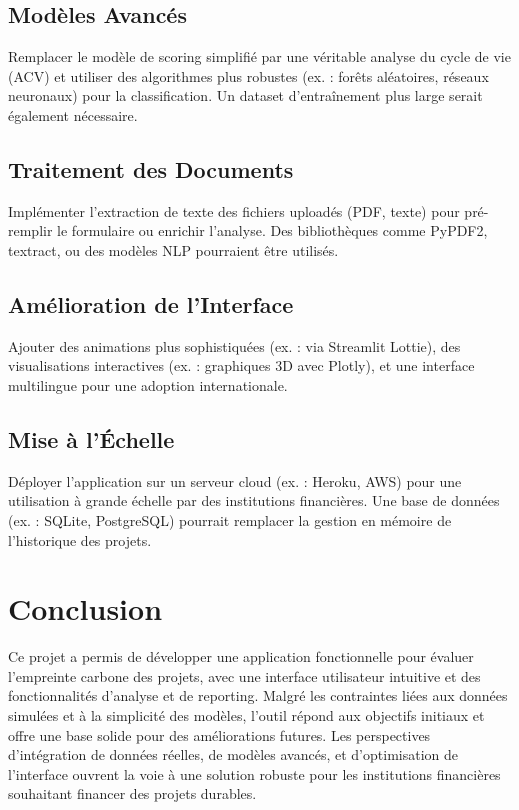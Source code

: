 \documentclass[a4paper,12pt]{article}
\begin{document}
\subsection{Modèles Avancés}
Remplacer le modèle de scoring simplifié par une véritable analyse du cycle de vie (ACV) et utiliser des algorithmes plus robustes (ex. : forêts aléatoires, réseaux neuronaux) pour la classification. Un dataset d'entraînement plus large serait également nécessaire.

\subsection{Traitement des Documents}
Implémenter l'extraction de texte des fichiers uploadés (PDF, texte) pour pré-remplir le formulaire ou enrichir l'analyse. Des bibliothèques comme PyPDF2, textract, ou des modèles NLP pourraient être utilisés.

\subsection{Amélioration de l'Interface}
Ajouter des animations plus sophistiquées (ex. : via Streamlit Lottie), des visualisations interactives (ex. : graphiques 3D avec Plotly), et une interface multilingue pour une adoption internationale.

\subsection{Mise à l'Échelle}
Déployer l'application sur un serveur cloud (ex. : Heroku, AWS) pour une utilisation à grande échelle par des institutions financières. Une base de données (ex. : SQLite, PostgreSQL) pourrait remplacer la gestion en mémoire de l'historique des projets.

\section{Conclusion}
Ce projet a permis de développer une application fonctionnelle pour évaluer l'empreinte carbone des projets, avec une interface utilisateur intuitive et des fonctionnalités d'analyse et de reporting. Malgré les contraintes liées aux données simulées et à la simplicité des modèles, l'outil répond aux objectifs initiaux et offre une base solide pour des améliorations futures. Les perspectives d'intégration de données réelles, de modèles avancés, et d'optimisation de l'interface ouvrent la voie à une solution robuste pour les institutions financières souhaitant financer des projets durables.
\end{document}

